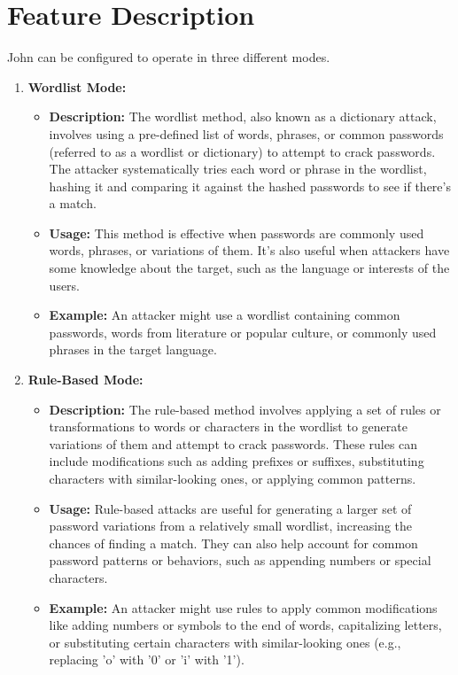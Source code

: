 \documentclass[12pt, A4Paper]{article}
\begin{document}
\section{Feature Description}
John can be configured to operate in three different modes.

\begin{enumerate}
    \item \textbf{Wordlist Mode:}
    \begin{itemize}
        \item \textbf{Description:} The wordlist method, also known as a dictionary attack, involves using a pre-defined list of words, phrases, or common passwords (referred to as a wordlist or dictionary) to attempt to crack passwords. The attacker systematically tries each word or phrase in the wordlist, hashing it and comparing it against the hashed passwords to see if there's a match.
        \item \textbf{Usage:} This method is effective when passwords are commonly used words, phrases, or variations of them. It's also useful when attackers have some knowledge about the target, such as the language or interests of the users.
        \item \textbf{Example:} An attacker might use a wordlist containing common passwords, words from literature or popular culture, or commonly used phrases in the target language.
    \end{itemize}

    \item \textbf{Rule-Based Mode:}
    \begin{itemize}
        \item \textbf{Description:} The rule-based method involves applying a set of rules or transformations to words or characters in the wordlist to generate variations of them and attempt to crack passwords. These rules can include modifications such as adding prefixes or suffixes, substituting characters with similar-looking ones, or applying common patterns.
        \item \textbf{Usage:} Rule-based attacks are useful for generating a larger set of password variations from a relatively small wordlist, increasing the chances of finding a match. They can also help account for common password patterns or behaviors, such as appending numbers or special characters.
        \item \textbf{Example:} An attacker might use rules to apply common modifications like adding numbers or symbols to the end of words, capitalizing letters, or substituting certain characters with similar-looking ones (e.g., replacing 'o' with '0' or 'i' with '1').
    \end{itemize}


\end{enumerate}
\end{document}
